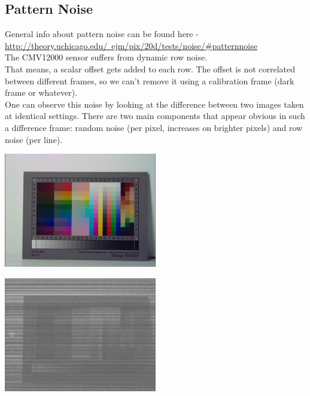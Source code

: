     

\subsection{Pattern Noise}

General info about pattern noise can be found here - \href{http://theory.uchicago.edu/~ejm/pix/20d/tests/noise/#patternnoise}{http://theory.uchicago.edu/~ejm/pix/20d/tests/noise/\#patternnoise} \\

The CMV12000 sensor suffers from dynamic row noise.\\

That means, a scalar offset gets added to each row. The offset is not correlated between different frames, so we can't remove it using a calibration frame (dark frame or whatever).\\

One can observe this noise by looking at the difference between two images taken at identical settings. There are two main components that appear obvious in such a difference frame: random noise (per pixel, increases on brighter pixels) and row noise (per line). \\

\begin{center}
\includegraphics[height=5cm]{images/it8-gainx1-offset2047-20ms-01}
\end{center}

\begin{center}
\includegraphics[height=5cm]{images/it8-gainx1-offset2047-20ms-01-minus-02-small}
\end{center}





